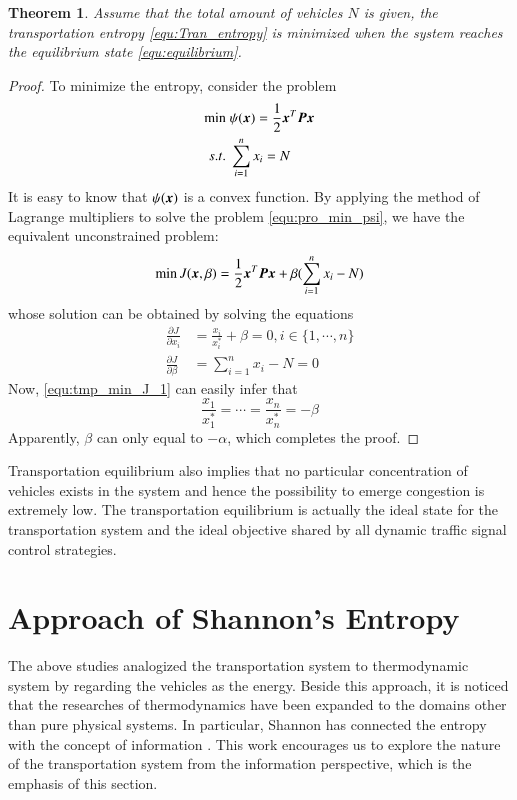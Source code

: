 \documentclass[preprint,authoryear,12pt]{elsarticle}
\renewcommand{\vec}[1]{\mbox{\boldmath$#1$}}
\newcommand{\mat}[1]{\mbox{\boldmath$#1$}}
\newtheorem{thm}{Theorem}
\begin{document}
\begin{thm}\label{thm:entropy_equilibrium}
Assume that the total amount of vehicles $N$ is given, the
transportation entropy \eqref{equ:Tran_entropy} is minimized when the
system reaches the equilibrium state \eqref{equ:equilibrium}.
\end{thm}
\begin{proof}
To minimize the entropy, consider the problem
\begin{align}\label{equ:pro_min_psi}
\min\; &\psi(\vec{x}) = \frac{1}{2}\vec{x}^T\mat{P}\vec{x}\\
s.t.\; &\sum_{i=1}^n x_i = N \nonumber
\end{align}
It is easy to know that $\psi(\vec{x})$ is a convex function. By
applying the method of Lagrange multipliers to solve the problem
\eqref{equ:pro_min_psi}, we have the equivalent unconstrained
problem:
$$\min J(\vec{x},\beta) =
\frac{1}{2}\vec{x}^T\mat{P}\vec{x}+\beta(\sum_{i=1}^n x_i - N)$$
whose solution can be obtained by solving the equations
\begin{align}
\label{equ:tmp_min_J_1}
\frac{\partial J}{\partial x_i} &= \frac{x_i}{x_i^*}+\beta =0,
i\in\{1,\cdots,n\}\\
\label{equ:tmp_min_J_2}
\frac{\partial J}{\partial \beta} &= \sum_{i=1}^n x_i - N =0
\end{align}
Now, \eqref{equ:tmp_min_J_1} can easily infer that
$$\frac{x_1}{x_1^*}=\cdots=\frac{x_n}{x_n^*}=-\beta
$$
Apparently, $\beta$ can only equal to $-\alpha$, which completes the
proof.
\end{proof}

Transportation equilibrium also implies that no particular
concentration of vehicles exists in the system and hence the
possibility to emerge congestion is extremely low. The transportation
equilibrium is actually the ideal state for the transportation system
and the ideal objective shared by all dynamic traffic signal control
strategies.

\section{Approach of Shannon's Entropy}

The above studies analogized the transportation system to
thermodynamic system by regarding the vehicles as the energy. Beside
this approach, it is noticed that the researches of thermodynamics
have been expanded to the domains other than pure physical systems.
In particular, Shannon has connected the entropy with the concept of
information \citep{Shannon1948}. This work encourages us to explore
the nature of the transportation system from the information
perspective, which is the emphasis of this section.
\end{document}
